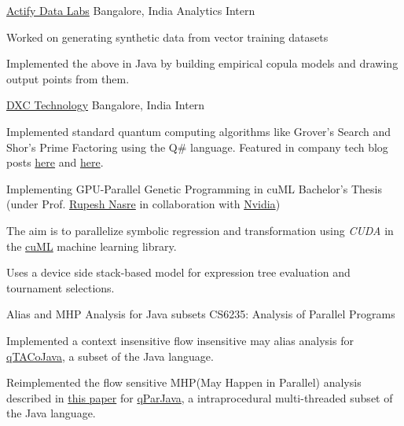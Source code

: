 \documentclass[10pt]{article}
\begin{document}
\headedsection
{\href{https://actifydatalabs.com/}{Actify Data Labs}}
{Bangalore, India}
{Analytics Intern}
{}
{
	\vspace{-2.4ex}
	\begin{circlist}
		\item Worked on generating synthetic data from vector training datasets
		\item Implemented the above in Java by building empirical copula models and drawing output points from them.
	\end{circlist}
}

\headedsection
{\href{https://www.dxc.technology/}{DXC Technology}}
{Bangalore, India}
{Intern}
{}
{
	\vspace{-2.4ex}
	\begin{circlist}
		\item Implemented standard quantum computing algorithms like Grover's Search and Shor's Prime Factoring using the Q\# language. Featured in company tech blog posts \href{https://blogs.dxc.technology/2018/07/30/what-i-learned-quantum-computing-experiment/}{here} and \href{https://blogs.dxc.technology/2018/08/08/my-experience-as-a-dxc-labs-intern/}{here}. 
	\end{circlist}
}

\spacedhrule{0.8ex}{0.0ex}

	\headedsectionthree
	{Implementing GPU-Parallel Genetic Programming in cuML}
	{}
	{Bachelor's Thesis (under Prof. \href{https://www.cse.iitm.ac.in/~rupesh/}{Rupesh Nasre} in collaboration with \href{https://www.nvidia.com/en-in/}{Nvidia})}
	{\vspace{-2.4ex}
		\begin{circlist}
			\item The aim is to parallelize symbolic regression and transformation using \textit{CUDA} in the \href{https://github.com/rapidsai/cuml}{cuML} machine learning library.
			\item Uses a device side stack-based model for expression tree evaluation and tournament selections. 
		\end{circlist}
	}
	\headedsectionthree
	{Alias and MHP Analysis for Java subsets}
	{}
	{CS6235: Analysis of Parallel Programs}
	{\vspace{-2.4ex}
		\begin{circlist}
			\item Implemented a context insensitive flow insensitive may alias analysis for \href{http://www.cse.iitm.ac.in/~krishna/cs6235/subsets.html}{qTACoJava}, a subset of the Java language. 
			\item Reimplemented the flow sensitive MHP(May Happen in Parallel) analysis described in \href{https://dl.acm.org/doi/10.1145/318774.319252}{this paper} for \href{http://www.cse.iitm.ac.in/~krishna/cs6235/subsets.html}{qParJava}, a intraprocedural multi-threaded subset of the Java language.
		\end{circlist}
	}
	
\end{document}
